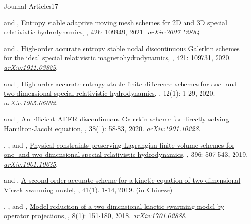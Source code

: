 \begin{cvpublicationsection}{Journal Articles}{17}
%
\item {} and , \href{https://doi.org/10.1016/j.jcp.2020.109949}{Entropy stable adaptive moving mesh schemes for 2D and 3D special relativistic hydrodynamics}, , 426: 109949, 2021. \href{https://arxiv.org/abs/2007.12884}{\em arXiv:2007.12884}.
%
\item {} and , \href{https://doi.org/10.1016/j.jcp.2020.109731}{High-order accurate entropy stable nodal discontinuous Galerkin schemes for the ideal special relativistic magnetohydrodynamics}, , 421: 109731, 2020. \href{https://arxiv.org/abs/1911.03825}{\em arXiv:1911.03825}.
%
\item {} and , \href{https://doi.org/10.4208/aamm.OA-2019-0124}{High-order accurate entropy stable finite difference schemes for one- and two-dimensional special relativistic hydrodynamics}, , 12(1): 1-29, 2020. \href{https://arxiv.org/abs/1905.06092}{\em arXiv:1905.06092}.
%
\item {} and , \href{https://doi.org/10.4208/jcm.1902-m2018-0189}{An efficient ADER discontinuous Galerkin scheme for directly solving Hamilton-Jacobi equation}, , 38(1): 58-83, 2020. \href{https://arxiv.org/abs/1901.10228}{\em arXiv:1901.10228}.
%
\item {}, , and , \href{https://doi.org/10.1016/j.jcp.2019.06.055}{Physical-constraints-preserving Lagrangian finite volume schemes for one- and two-dimensional special relativistic hydrodynamics}, , 396: 507-543, 2019. \href{https://arxiv.org/abs/1901.10625}{\em arXiv:1901.10625}.
%
\item {} and , \href{https://xydz.cbpt.cnki.net/WKA/WebPublication/wkTextContent.aspx?colType=4&yt=2019&st=01}{A second-order accurate scheme for a kinetic equation of two-dimensional Vicsek swarming model}, , 41(1): 1-14, 2019. (in Chinese)
%
\item {}, , and , \href{https://doi.org/10.4208/eajam.170617.141117a}{Model reduction of a two-dimensional kinetic swarming model by operator projections}, , 8(1): 151-180, 2018. \href{https://arxiv.org/abs/1701.02888}{\em arXiv:1701.02888}.
\end{cvpublicationsection}

